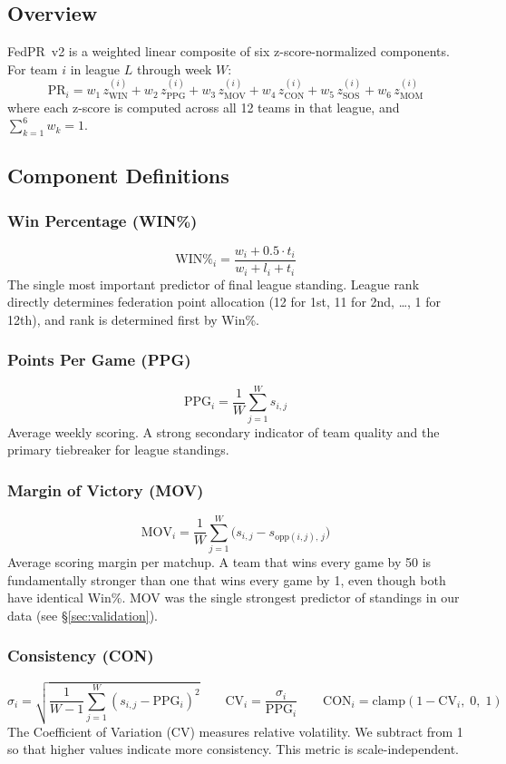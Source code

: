 \documentclass[11pt,a4paper]{article}
\begin{document}
\subsection{Overview}

FedPR~v2 is a weighted linear composite of six z-score-normalized components. For team $i$ in league $L$ through week $W$:
\[
\text{PR}_i = w_1\, z^{(i)}_{\text{WIN}} + w_2\, z^{(i)}_{\text{PPG}} + w_3\, z^{(i)}_{\text{MOV}} + w_4\, z^{(i)}_{\text{CON}} + w_5\, z^{(i)}_{\text{SOS}} + w_6\, z^{(i)}_{\text{MOM}}
\]
where each z-score is computed across all 12 teams in that league, and $\sum_{k=1}^{6} w_k = 1$.

\subsection{Component Definitions}

\subsubsection{Win Percentage (WIN\%)}
\[
\text{WIN\%}_i = \frac{w_i + 0.5 \cdot t_i}{w_i + l_i + t_i}
\]
The single most important predictor of final league standing. League rank directly determines federation point allocation (12 for 1st, 11 for 2nd, \ldots, 1 for 12th), and rank is determined first by Win\%.

\subsubsection{Points Per Game (PPG)}
\[
\text{PPG}_i = \frac{1}{W} \sum_{j=1}^{W} s_{i,j}
\]
Average weekly scoring. A strong secondary indicator of team quality and the primary tiebreaker for league standings.

\subsubsection{Margin of Victory (MOV)}
\[
\text{MOV}_i = \frac{1}{W} \sum_{j=1}^{W} \bigl(s_{i,j} - s_{\text{opp}(i,j),\, j}\bigr)
\]
Average scoring margin per matchup. A team that wins every game by 50 is fundamentally stronger than one that wins every game by 1, even though both have identical Win\%. MOV was the single strongest predictor of standings in our data (see \S\ref{sec:validation}).

\subsubsection{Consistency (CON)}
\[
\sigma_i = \sqrt{\frac{1}{W-1}\sum_{j=1}^{W}(s_{i,j} - \text{PPG}_i)^2} \qquad
\text{CV}_i = \frac{\sigma_i}{\text{PPG}_i} \qquad
\text{CON}_i = \text{clamp}(1 - \text{CV}_i,\; 0,\; 1)
\]
The Coefficient of Variation (CV) measures relative volatility. We subtract from 1 so that higher values indicate more consistency. This metric is scale-independent.
\end{document}
